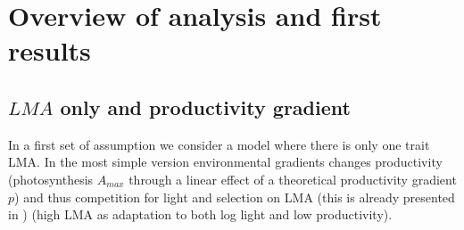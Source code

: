 \documentclass[a4paper,11pt]{article}
\begin{document}





\section{Overview of analysis and first results}


\subsection{$LMA$ only and productivity gradient}

In a first set of assumption we consider a model where there is only one trait LMA. In the most simple version environmental gradients changes productivity (photosynthesis $A_{max}$ through a linear effect of a theoretical productivity gradient $p$) and
thus competition for light and selection on LMA (this is already presented in \citet{Falster-2017}) (high LMA as adaptation to both log light and low productivity).
\end{document}
